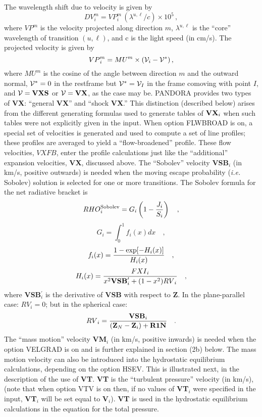 The wavelength shift due to velocity is given by
$$ {DV}_i^m = {VP}_i^m \, ( \lambda^{u,\ell} / c ) \times 10^5 \, , $$
where ${VP}^m$ is the velocity projected along direction $m$, $\lambda^{u,\ell}$
is the ``core'' wavelength of transition $(u,\ell)$, and c is the light speed
(in cm/s). The projected velocity is given by
$$ {VP}_i^m = {MU}^m \times ({\cal V}_i - {\cal V}^*) \, , $$
where ${MU}^m$ is the cosine of the angle between direction $m$ and the outward
normal, ${\cal V}^* = 0$ in the restframe but ${\cal V}^* = {\cal V}_I$ in
the frame comoving with point $I$, and ${\cal V} = {\bf VXS}$ or
${\cal V} = {\bf VX}$, as the case may be.
\ej
PANDORA provides two types of {\bf VX}: ``general {\bf VX}'' and
``shock {\bf VX}.'' This distinction (described below) arises from the
different generating formulas used to generate tables of ${\bf VX}_i$ when
such tables were not explicitly given in the input.
\blankline
\blankline
{}
\blankline
When option FLWBROAD is on, a special set of velocities is generated and 
used to compute a set of line profiles; these profiles are averaged to yield a
``flow-broadened'' profile. These flow velocities, $VXFB$, enter the profile
calculations just like the ``additional'' expansion velocities, {\bf VX},
discussed above.
\blankline
\blankline
{}
\blankline
The ``Sobolev'' velocity {\bf VSB}$_i$ (in km/s, positive outwards) is needed
when the moving escape
probability ({\it i.e.} Sobolev) solution is selected for one or more
transitions. The Sobolev formula for the net radiative bracket is
$$ {RHO}^{\rm Sobolev}_i = G_i \left( 1 - { J_i \over S_i } \right) \quad , $$
$$ G_i = \int^1_0 {f_i(x)dx} \quad , $$
$$ f_i(x) = { {1 - \exp [-H_i(x)] } \over {H_i(x)} } \quad , $$
$$ H_i(x) = { {FXI}_i \over { x^2 {\bf VSB}^{\prime}_i + 
( 1 - x^2 ) {RV}_i } } \quad , $$
where {\bf VSB}$^{\prime}_i$ is the derivative of {\bf VSB} with respect
to {\bf Z}. In the plane-parallel case: ${RV}_i = 0$; but in the
spherical case:
$$ {RV}_i = { {\bf VSB}_i \over { ( {\bf Z}_N - {\bf Z}_i ) + {\bf R1N} } } \quad . $$
\blankline
\blankline
{}
\blankline
The ``mass motion'' velocity {\bf VM}$_i$ (in km/s, positive inwards) is needed 
when the option VELGRAD is on and is further explained in section (2b) below.
The mass motion velocity can also be introduced into the
hydrostatic equilibrium calculations, depending on the option HSEV. This is
illustrated next, in the description of the use of {\bf VT}.
\ej 
{}
\blankline
{\bf VT} is the ``turbulent pressure'' velocity (in km/s), (note that when
option VTV is on then, if no values of {\bf VT}$_i$ were specified in the input,
{\bf VT}$_i$ will be set equal to {\bf V}$_i$). {\bf VT} is used in the
hydrostatic equilibrium calculations in the equation for the total pressure.

